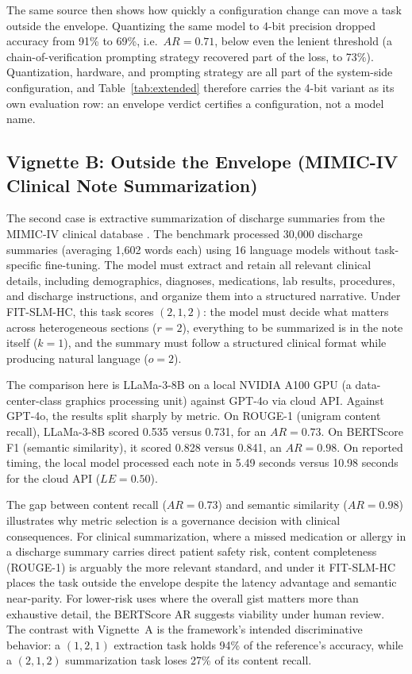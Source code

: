 \documentclass[11pt]{article}
\begin{document}
The same source then shows how quickly a configuration change can move a task outside the envelope. Quantizing the same model to 4-bit precision dropped accuracy from 91\% to 69\%, i.e.\ $AR = 0.71$, below even the lenient threshold (a chain-of-verification prompting strategy recovered part of the loss, to 73\%). Quantization, hardware, and prompting strategy are all part of the system-side configuration, and Table~\ref{tab:extended} therefore carries the 4-bit variant as its own evaluation row: an envelope verdict certifies a configuration, not a model name.

\subsection{Vignette B: Outside the Envelope (MIMIC-IV Clinical Note Summarization)}
\label{sec:vignette-b}

The second case is extractive summarization of discharge summaries from the MIMIC-IV clinical database \cite{Naemi2025}. The benchmark processed 30{,}000 discharge summaries (averaging 1{,}602 words each) using 16 language models without task-specific fine-tuning. The model must extract and retain all relevant clinical details, including demographics, diagnoses, medications, lab results, procedures, and discharge instructions, and organize them into a structured narrative. Under FIT-SLM-HC, this task scores $(2, 1, 2)$: the model must decide what matters across heterogeneous sections ($r=2$), everything to be summarized is in the note itself ($k=1$), and the summary must follow a structured clinical format while producing natural language ($o=2$).

The comparison here is LLaMa-3-8B on a local NVIDIA A100 GPU (a data-center-class graphics processing unit) against GPT-4o via cloud API. Against GPT-4o, the results split sharply by metric. On ROUGE-1 (unigram content recall), LLaMa-3-8B scored 0.535 versus 0.731, for an $AR = 0.73$. On BERTScore F1 (semantic similarity), it scored 0.828 versus 0.841, an $AR = 0.98$. On reported timing, the local model processed each note in 5.49 seconds versus 10.98 seconds for the cloud API ($LE = 0.50$).

The gap between content recall ($AR = 0.73$) and semantic similarity ($AR = 0.98$) illustrates why metric selection is a governance decision with clinical consequences. For clinical summarization, where a missed medication or allergy in a discharge summary carries direct patient safety risk, content completeness (ROUGE-1) is arguably the more relevant standard, and under it FIT-SLM-HC places the task outside the envelope despite the latency advantage and semantic near-parity. For lower-risk uses where the overall gist matters more than exhaustive detail, the BERTScore AR suggests viability under human review. The contrast with Vignette~A is the framework's intended discriminative behavior: a $(1,2,1)$ extraction task holds 94\% of the reference's accuracy, while a $(2,1,2)$ summarization task loses 27\% of its content recall.
\end{document}
